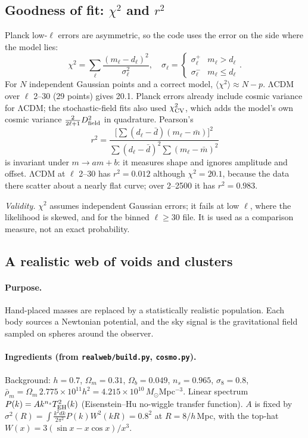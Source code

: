 \documentclass[10pt,twocolumn]{article}
\newcommand{\why}[1]{\par\noindent\textit{Validity.} #1\par}
\begin{document}
\subsection{Goodness of fit: $\chi^2$ and $r^2$}\label{sec:stats}
Planck low-$\ell$ errors are asymmetric, so the code uses the error on the side where the model lies:
\begin{equation}\label{eq:chi2}
\chi^2=\sum_\ell\frac{(m_\ell-d_\ell)^2}{\sigma_\ell^2},\quad\sigma_\ell=\begin{cases}\sigma^+_\ell&m_\ell>d_\ell\\\sigma^-_\ell&m_\ell\le d_\ell\end{cases}.
\end{equation}
For $N$ independent Gaussian points and a correct model, $\langle\chi^2\rangle\approx N-p$. ΛCDM over $\ell$ 2--30 (29 points) gives 20.1. Planck errors already include cosmic variance for ΛCDM; the stochastic-field fits also used $\chi^2_{\rm CV}$, which adds the model's own cosmic variance $\tfrac{2}{2\ell+1}D_{\rm field}^2$ in quadrature. Pearson's
\begin{equation}
r^2=\frac{\big[\sum(d_\ell-\bar d)(m_\ell-\bar m)\big]^2}{\sum(d_\ell-\bar d)^2\sum(m_\ell-\bar m)^2}
\end{equation}
is invariant under $m\to am+b$: it measures shape and ignores amplitude and offset. ΛCDM at $\ell$ 2--30 has $r^2=0.012$ although $\chi^2=20.1$, because the data there scatter about a nearly flat curve; over 2--2500 it has $r^2=0.983$.
\why{$\chi^2$ assumes independent Gaussian errors; it fails at low $\ell$, where the likelihood is skewed, and for the binned $\ell\ge30$ file. It is used as a comparison measure, not an exact probability.}

\subsection{A realistic web of voids and clusters}\label{sec:web}
\paragraph{Purpose.} Hand-placed masses are replaced by a statistically realistic population. Each body sources a Newtonian potential, and the sky signal is the gravitational field sampled on spheres around the observer.

\paragraph{Ingredients (from \texttt{realweb/build.py}, \texttt{cosmo.py}).} Background: $h=0.7$, $\Omega_m=0.31$, $\Omega_b=0.049$, $n_s=0.965$, $\sigma_8=0.8$, $\bar\rho_m=\Omega_m\,2.775\times10^{11}h^2=4.215\times10^{10}\,M_\odot$Mpc$^{-3}$. Linear spectrum $P(k)=Ak^{n_s}T_{\rm EH}^2(k)$ (Eisenstein--Hu no-wiggle transfer function). $A$ is fixed by $\sigma^2(R)=\int\frac{k^2dk}{2\pi^2}P(k)W^2(kR)=0.8^2$ at $R=8/h$\,Mpc, with the top-hat $W(x)=3(\sin x-x\cos x)/x^3$.
\end{document}

